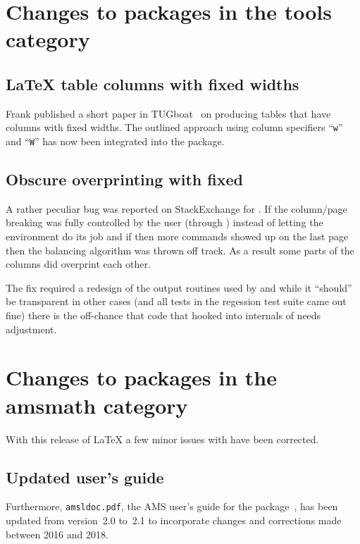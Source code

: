\documentclass{ltnews}
\begin{document}
\section{Changes to packages in the tools category}

\subsection{\LaTeX{} table columns with fixed widths}

Frank published a short paper in
TUGboat~\cite{Mittelbach:TB38-2-213} on producing tables that have
columns with fixed widths. The outlined approach using column
specifiers ``\texttt{w}'' and ``\texttt{W}'' has now been integrated
into the  package.

\subsection{Obscure overprinting with  fixed}

A rather peculiar bug was reported on StackExchange for
. If the column/page breaking was fully controlled by
the user (through ) instead of letting the environment
do its job and if then more  commands showed up on the
last page then the balancing algorithm was thrown off track.
As a result some parts of the columns did overprint each other.

The fix required a redesign of the output routines used by
 and while it ``should'' be transparent in other cases
(and all tests in the regession test suite came out fine) there is the
off-chance that code that hooked into internals of 
needs adjustment.


\section{Changes to packages in the amsmath category}

With this release of \LaTeX{} a few minor issues with 
have been corrected.

\subsection{Updated user's guide}

Furthermore, \texttt{amsldoc.pdf}, the AMS user's
guide for the  package~\cite{amsldoc}, has been updated
from version~2.0 to~2.1 to incorporate changes and corrections made
between 2016 and 2018.
\end{document}
